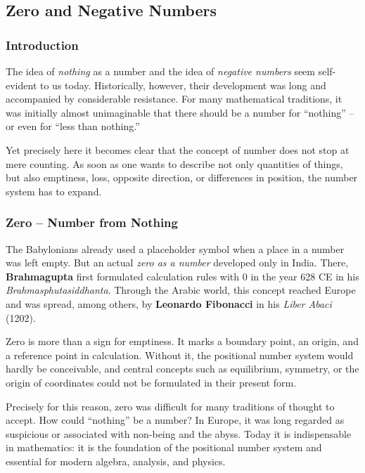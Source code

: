\subsection{Zero and Negative Numbers}
\label{sec:2.3_zero_negative}

\subsubsection*{Introduction}
The idea of \emph{nothing} as a number
and the idea of \emph{negative numbers}
seem self-evident to us today.
Historically, however, their development was long
and accompanied by considerable resistance.
For many mathematical traditions, it was initially almost unimaginable
that there should be a number for ``nothing'' --
or even for ``less than nothing.''

Yet precisely here it becomes clear
that the concept of number does not stop at mere counting.
As soon as one wants to describe not only quantities of things,
but also emptiness, loss, opposite direction, or differences in position,
the number system has to expand.

\subsubsection*{Zero -- Number from Nothing}
The Babylonians already used a placeholder symbol
when a place in a number was left empty.
But an actual \emph{zero as a number} developed only in India.
There, \textbf{Brahmagupta}
first formulated calculation rules with $0$
in the year 628 CE
in his \emph{Brahmasphutasiddhanta}.
Through the Arabic world, this concept reached Europe
and was spread, among others, by
\textbf{Leonardo Fibonacci}
in his \emph{Liber Abaci} (1202).

Zero is more than a sign for emptiness.
It marks a boundary point,
an origin, and a reference point in calculation.
Without it, the positional number system would hardly be conceivable,
and central concepts such as equilibrium, symmetry, or the origin of coordinates
could not be formulated in their present form.

Precisely for this reason, zero was difficult for many traditions of thought to accept.
How could ``nothing'' be a number?
In Europe, it was long regarded as suspicious
or associated with non-being and the abyss.
Today it is indispensable in mathematics:
it is the foundation of the positional number system
and essential for modern algebra, analysis, and physics.

